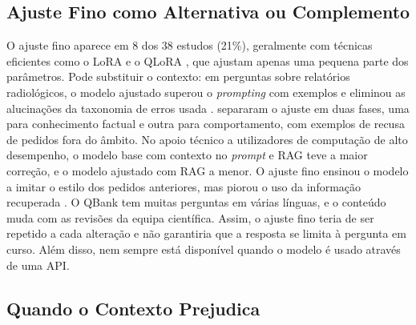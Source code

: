 \subsection{Ajuste Fino como Alternativa ou Complemento}
\label{sec:chap2_finetuning}

O ajuste fino aparece em 8 dos 38 estudos (21\%), geralmente com técnicas eficientes como o LoRA e o QLoRA \parencite{feng2025survey,xu2026parameter}, que ajustam apenas uma pequena parte dos parâmetros. Pode substituir o contexto: em perguntas sobre relatórios radiológicos, o modelo ajustado superou o \emph{prompting} com exemplos e eliminou as alucinações da taxonomia de erros usada \parencite{hamidi2026large}. \textcite{abrar2025domain} separaram o ajuste em duas fases, uma para conhecimento factual e outra para comportamento, com exemplos de recusa de pedidos fora do âmbito. No apoio técnico a utilizadores de computação de alto desempenho, o modelo base com contexto no \emph{prompt} e \gls{RAG} teve a maior correção, e o modelo ajustado com \gls{RAG} a menor. O ajuste fino ensinou o modelo a imitar o estilo dos pedidos anteriores, mas piorou o uso da informação recuperada \parencite{zheng2026comparative}. O QBank tem muitas perguntas em várias línguas, e o conteúdo muda com as revisões da equipa científica. Assim, o ajuste fino teria de ser repetido a cada alteração e não garantiria que a resposta se limita à pergunta em curso. Além disso, nem sempre está disponível quando o modelo é usado através de uma \gls{API}.

\subsection{Quando o Contexto Prejudica}
\label{sec:chap2_rag_hurts}

